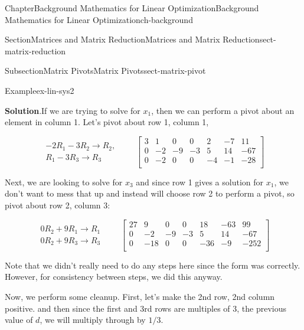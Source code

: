 \documentclass[oneside,10pt,]{book}
\newcommand{\blocktitlefont}{\relax}
\numberwithin{equation}{section}
\newcommand{\amp}{&}
\begin{document}
\begin{chapterptx}{Chapter}{Background Mathematics for Linear Optimization}{}{Background Mathematics for Linear Optimization}{}{}{ch-background}
\begin{sectionptx}{Section}{Matrices and Matrix Reduction}{}{Matrices and Matrix Reduction}{}{}{sect-matrix-reduction}
\begin{subsectionptx}{Subsection}{Matrix Pivots}{}{Matrix Pivots}{}{}{sect-matrix-pivot}
\begin{example}{Example}{}{ex-lin-sys2}
\begin{equation*}
\end{equation*}
%
\par\smallskip%
\noindent\textbf{\blocktitlefont Solution}.\hypertarget{ex-lin-sys2-2}{}\quad{}If we are trying to solve for \(x_1\), then we can perform a pivot about an element in column 1. Let's pivot about row 1, column 1,%
\par
%
\begin{equation*}
\begin{array}{r} -2R_1 - 3R_2 \to R_2,\\ R_1 -3R_3 \to R_3 \end{array} \qquad \left[\begin{array}{rrrrrr|r} 3 \amp 1 \amp 0 \amp 0 \amp 2 \amp -7 \amp 11\\ 0 \amp -2 \amp -9 \amp -3 \amp 5 \amp 14 \amp -67\\ 0 \amp -2 \amp 0 \amp 0 \amp -4 \amp -1 \amp -28\\ \end{array} \right]
\end{equation*}
%
\par
Next, we are looking to solve for \(x_3\) and since row 1 gives a solution for \(x_1\), we don't want to mess that up and instead will choose row 2 to perform a pivot, so pivot about row 2, column 3:%
\par
%
\begin{equation*}
\begin{array}{r} 0R_2 + 9R_1 \to R_1 \\ 0R_2 + 9R_3 \to R_3 \end{array} \qquad \left[\begin{array}{rrrrrr|r} 27 \amp 9 \amp 0 \amp 0 \amp 18 \amp -63 \amp 99\\ 0 \amp -2 \amp -9 \amp -3 \amp 5 \amp 14 \amp -67\\ 0 \amp -18 \amp 0 \amp 0 \amp -36 \amp -9 \amp -252\\ \end{array} \right]
\end{equation*}
%
\par
Note that we didn't really need to do any steps here since the form was correctly. However, for consistency between steps, we did this anyway.%
\par
Now, we perform some cleanup. First, let's make the 2nd row, 2nd column positive. and then since the first and 3rd rows are multiples of 3, the previous value of \(d\), we will multiply through by \(1/3\).%
\par
%
\begin{equation*}

\end{equation*}
\end{example}
\end{subsectionptx}
\end{sectionptx}
\end{chapterptx}
\end{document}
